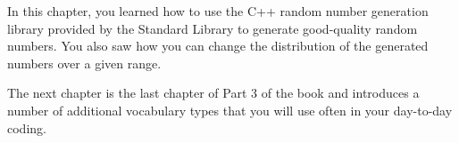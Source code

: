 In this chapter, you learned how to use the C++ random number generation library provided by the Standard Library to generate good-quality random numbers. You also saw how you can change the distribution of the generated numbers over a given range.

The next chapter is the last chapter of Part 3 of the book and introduces a number of additional vocabulary types that you will use often in your day-to-day coding.